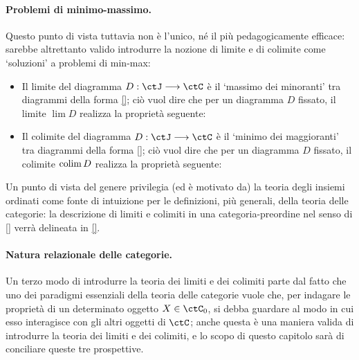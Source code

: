 \paragraph*{Problemi di minimo-massimo.}
Questo punto di vista tuttavia non è l'unico, né il più pedagogicamente efficace: sarebbe altrettanto valido introdurre la nozione di limite e di colimite come `soluzioni' a problemi di min-max:
\begin{itemize}
	\item Il limite del diagramma \(D : \ctJ\fun\ctC\) è il `massimo dei minoranti' tra diagrammi della forma \eqref{}; ciò vuol dire che per un diagramma \(D\) fissato, il limite \(\lim D\) realizza la proprietà seguente:
	      \Todo{}
	\item Il colimite del diagramma \(D : \ctJ\fun\ctC\) è il `minimo dei maggioranti' tra diagrammi della forma \eqref{}; ciò vuol dire che per un diagramma \(D\) fissato, il colimite \(\operatorname*{colim} D\) realizza la proprietà seguente:
	      \Todo{}
\end{itemize}
Un punto di vista del genere privilegia (ed è motivato da) la teoria degli insiemi ordinati come fonte di intuizione per le definizioni, più generali, della teoria delle categorie: la descrizione di limiti e colimiti in una categoria-preordine nel senso di \ref{} verrà delineata in \ref{}.
\Todo{}
\paragraph*{Natura relazionale delle categorie.}
Un terzo modo di introdurre la teoria dei limiti e dei colimiti parte dal fatto che uno dei paradigmi essenziali della teoria delle categorie vuole che, per indagare le proprietà di un determinato oggetto \(X\in\ctC_0\), si debba guardare al modo in cui esso interagisce con gli altri oggetti di \(\ctC\); anche questa è una maniera valida di introdurre la teoria dei limiti e dei colimiti, e lo scopo di questo capitolo sarà di conciliare queste tre prospettive.


